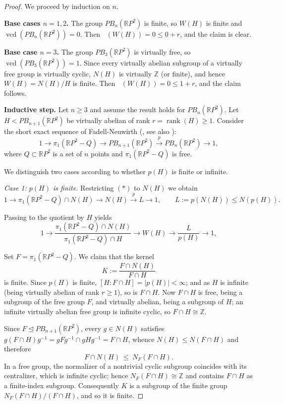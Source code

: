 \documentclass[a4paper,12pt,leqno]{amsart}
\theoremstyle{definition}
\newcommand{\calF}{{\mathcal F}}
\DeclareMathOperator{\vcd}{vcd}
\DeclareMathOperator{\gdfin}{gd_{\calF_0}}
\DeclareMathOperator{\rank}{rank}
\begin{document}
\begin{proof}
We proceed by induction on $n$.

\medskip
\noindent\textbf{Base cases $n=1,2$.}
The group $PB_n(\mathbb{R}P^2)$ is finite, so $W(H)$ is finite and $\vcd(PB_n(\mathbb{R}P^2))=0$. Then $\gdfin(W(H))=0\le 0+r$, and the claim is clear.

\medskip
\noindent\textbf{Base case $n=3$.}
The group $PB_3(\mathbb{R} P^2)$ is virtually free, so $\vcd(PB_3(\mathbb{R}P^2))=1$. Since every virtually abelian subgroup of a virtually free group is virtually cyclic, $N(H)$ is virtually $\mathbb{Z}$ (or finite), and hence $W(H)=N(H)/H$ is finite. Then $\gdfin(W(H))=0\le 1+r$, and the claim follows.

\medskip
\noindent\textbf{Inductive step.}
Let $n\ge 3$ and assume the result holds for $PB_n(\mathbb{R}P^2)$. Let $H<PB_{n+1}(\mathbb{R}P^2)$ be virtually abelian of rank $r=\rank(H)\geq1$. Consider the short exact sequence of Fadell-Neuwirth (\cite{Fadell1962}, see also \cite{GG2010}):
\[
1 \longrightarrow \pi_1(\mathbb{R}P^2-Q) \longrightarrow PB_{n+1}(\mathbb{R}P^2) \xrightarrow{\;p\;} PB_n(\mathbb{R}P^2) \longrightarrow 1, \tag{$*$}
\]
where $Q\subset\mathbb{R}P^2$ is a set of $n$ points and $\pi_1(\mathbb{R}P^2-Q)$ is free.

We distinguish two cases according to whether $p(H)$ is finite or infinite.

\medskip
\noindent\emph{Case 1: $p(H)$ is finite.}
Restricting $(*)$ to $N(H)$ we obtain
\[
1\to \pi_1(\mathbb{R}P^2-Q)\cap N(H) \to N(H) \xrightarrow{\;p\;} L \to 1, \qquad L:=p(N(H))\le N(p(H)).
\]

Passing to the quotient by $H$ yields
\begin{equation}\label{s.e.s:254}
1\to \dfrac{\pi_1(\mathbb{R}P^2-Q)\cap N(H)}{\pi_1(\mathbb{R}P^2-Q)\cap H} \to W(H) \to \dfrac{L}{p(H)} \to 1,
\end{equation}



Set $F=\pi_1(\mathbb{R}P^2-Q)$. We claim that the kernel
\[
K:=\dfrac{F\cap N(H)}{F\cap H}
\]
is finite. Since $p(H)$ is finite, $[H:F\cap H]=|p(H)|<\infty$; and as $H$ is infinite (being virtually abelian of rank $r\ge 1$), so is $F\cap H$. Now $F\cap H$ is free, being a subgroup of the free group $F$, and virtually abelian, being a subgroup of $H$; an infinite virtually abelian free group is infinite cyclic, so $F\cap H\cong\mathbb{Z}$.

Since $F\trianglelefteq PB_{n+1}(\mathbb{R}P^2)$, every $g\in N(H)$ satisfies
$g(F\cap H)g^{-1}=gFg^{-1}\cap gHg^{-1}=F\cap H$, whence $N(H)\le N(F\cap H)$ and therefore
\[
F\cap N(H)\ \le\ N_F(F\cap H).
\]
In a free group, the normalizer of a nontrivial cyclic subgroup coincides with its centralizer, which is infinite cyclic; hence $N_F(F\cap H)\cong\mathbb{Z}$ and contains $F\cap H$ as a finite-index subgroup. Consequently $K$ is a subgroup of the finite group $N_F(F\cap H)/(F\cap H)$, and so it is finite.



\end{proof}
\end{document}
